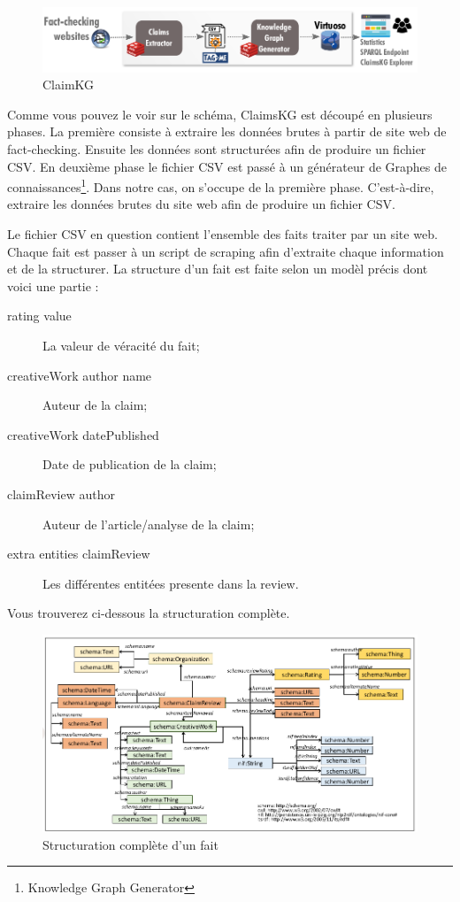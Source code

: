 \documentclass[oneside,13pt,a4paper]{report}
\begin{document}
\begin{figure}[h]
	\centering
	\begin{minipage}[c]{.95\linewidth}
		\includegraphics[width=1\textwidth]{img/claim.png}
		\caption{ClaimKG}
	\end{minipage}
\end{figure}

Comme vous pouvez le voir sur le schéma, ClaimsKG est découpé en plusieurs phases. La première consiste à extraire les données brutes à partir de site web de fact-checking. Ensuite les données sont structurées afin de produire un fichier CSV. En deuxième phase le fichier CSV est passé à un générateur de Graphes de connaissances\footnote{Knowledge Graph Generator}. Dans notre cas, on s'occupe de la première phase. C'est-à-dire, extraire les données brutes du site web afin de produire un fichier CSV.

Le fichier CSV en question contient l'ensemble des faits traiter par un site web. Chaque fait est passer à un script de scraping afin d'extraite chaque information et de la structurer. La structure d'un fait est faite selon un modèl précis dont voici une partie :

\begin{description}
	\item[rating value] La valeur de véracité du fait;
	\item[creativeWork author name] Auteur de la claim;
	\item[creativeWork datePublished] Date de publication de la claim;
	\item[claimReview author] Auteur de l'article/analyse de la claim;
	\item[extra entities claimReview] Les différentes entitées presente dans la review.
\end{description}

Vous trouverez ci-dessous la structuration complète.

\begin{figure}[h]
	\centering
	\begin{minipage}[c]{.95\linewidth}
		\includegraphics[width=1\textwidth]{img/claimKG.png}
		\caption{Structuration complète d'un fait}
	\end{minipage}
\end{figure}
\end{document}
